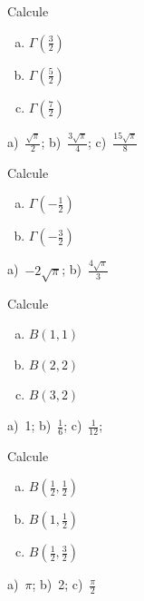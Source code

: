 \begin{exer}
  Calcule
  \begin{enumerate}[a)]
  \item $\Gamma\left(\frac{3}{2}\right)$\\
  \item $\Gamma\left(\frac{5}{2}\right)$\\
  \item $\Gamma\left(\frac{7}{2}\right)$\\
  \end{enumerate}
\end{exer}
\begin{resp}
  a)~$\frac{\sqrt{\pi}}{2}$; b)~$\frac{3\sqrt{\pi}}{4}$; c)~$\frac{15\sqrt{\pi}}{8}$
\end{resp}

\begin{exer}
  Calcule
  \begin{enumerate}[a)]
  \item $\Gamma\left(-\frac{1}{2}\right)$\\
  \item $\Gamma\left(-\frac{3}{2}\right)$
  \end{enumerate}
\end{exer}
\begin{resp}
  a)~$-2\sqrt{\pi}$; b)~$\frac{4\sqrt{\pi}}{3}$
\end{resp}

\begin{exer}
  Calcule
  \begin{enumerate}[a)]
  \item $B(1,1)$\\
  \item $B(2,2)$\\
  \item $B(3,2)$\\
  \end{enumerate}
\end{exer}
\begin{resp}
  a)~1; b)~$\frac{1}{6}$; c)~$\frac{1}{12}$;
\end{resp}

\begin{exer}
  Calcule
  \begin{enumerate}[a)]
  \item $B\left(\frac{1}{2},\frac{1}{2}\right)$\\
  \item $B\left(1,\frac{1}{2}\right)$\\
  \item $B\left(\frac{1}{2},\frac{3}{2}\right)$\\
  \end{enumerate}
\end{exer}
\begin{resp}
  a)~$\pi$; b)~2; c)~$\frac{\pi}{2}$
\end{resp}

